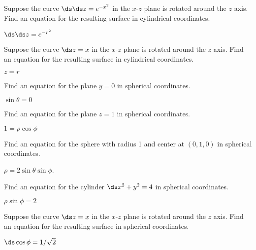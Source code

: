\begin{exercises}
\begin{exercise} Suppose the curve $\ds \ds z=e^{-x^2}$ in the $x$-$z$ plane is
rotated around the $z$ axis. Find an equation for the resulting
surface in cylindrical coordinates.
\begin{answer} $\ds \ds z=e^{-r^2}$
\end{answer}\end{exercise}

\begin{exercise} Suppose the curve $\ds z=x$ in the $x$-$z$ plane is
rotated around the $z$ axis. Find an equation for the resulting
surface in cylindrical coordinates.
\begin{answer} $z=r$
\end{answer}\end{exercise}
\label{ex:rotate z=x z axis cylindrical}

\begin{exercise} Find an equation for the plane $y=0$ in
spherical coordinates.
\begin{answer} $\sin\theta=0$
\end{answer}\end{exercise}

\begin{exercise} Find an equation for the plane $z=1$ in
spherical coordinates.
\begin{answer} $1=\rho\cos\phi$
\end{answer}\end{exercise}

\begin{exercise} Find an equation for the sphere with radius 1 and center at
$(0,1,0)$ in spherical coordinates.
\begin{answer} $\rho=2\sin\theta\sin\phi$.
\end{answer}\end{exercise}

\begin{exercise} Find an equation for the cylinder $\ds x^2+y^2=4$ in
spherical coordinates.
\begin{answer} $\rho\sin\phi=2$
\end{answer}\end{exercise}

\begin{exercise} Suppose the curve $\ds z=x$ in the $x$-$z$ plane is
rotated around the $z$ axis. Find an equation for the resulting
surface in spherical coordinates.
\begin{answer} $\ds \cos\phi=1/\sqrt2$
\end{answer}\end{exercise}
\label{ex:rotate z=x z axis spherical}


\end{exercises}
